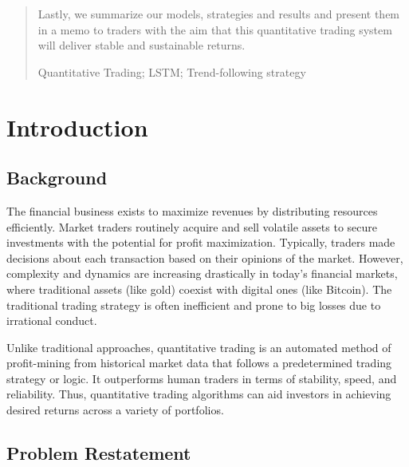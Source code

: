 \documentclass{mcmthesis}
\begin{document}
\begin{abstract}
Lastly, we summarize our models, strategies and results and present them in a memo to traders with the aim that this quantitative trading system will deliver stable and sustainable returns.
\begin{keywords}
Quantitative Trading; LSTM; Trend-following strategy
\end{keywords}
\end{abstract}
\maketitle
\setcounter{page}{1}
\tableofcontents
\newpage

\section{Introduction}
\subsection{Background}

	The financial business exists to maximize revenues by distributing resources efficiently. Market traders routinely acquire and sell volatile assets to secure investments with the potential for profit maximization. Typically, traders made decisions about each transaction based on their opinions of the market. However, complexity and dynamics are increasing drastically in today's financial markets, where traditional assets (like gold) coexist with digital ones (like Bitcoin). The traditional trading strategy is often inefficient and prone to big losses due to irrational conduct\cite{learning1}.
	
	Unlike traditional approaches, quantitative trading is an automated method of profit-mining from historical market data that follows a predetermined trading strategy or logic. It outperforms human traders in terms of stability, speed, and reliability\cite{learning2}. Thus, quantitative trading algorithms can aid investors in achieving desired returns across a variety of portfolios.

\subsection{Problem Restatement}
\end{document}
